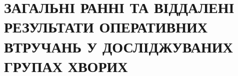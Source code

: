 \chapter{ЗАГАЛЬНІ РАННІ ТА ВІДДАЛЕНІ  РЕЗУЛЬТАТИ ОПЕРАТИВНИХ ВТРУЧАНЬ У ДОСЛІДЖУВАНИХ ГРУПАХ ХВОРИХ}